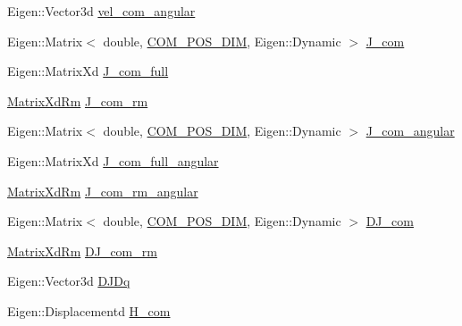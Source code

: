 \begin{DoxyCompactItemize}
\item 
\-Eigen\-::\-Vector3d \hyperlink{structOcraWbiModel_1_1OcraWbiModel__pimpl_a696d73e62837978589a2730c8feb325c}{vel\-\_\-com\-\_\-angular}
\item 
\-Eigen\-::\-Matrix$<$ double, \*
\hyperlink{OcraWbiModel_8cpp_a72cb22de2538ae949cc73fa3d7c33bdc}{\-C\-O\-M\-\_\-\-P\-O\-S\-\_\-\-D\-I\-M}, \-Eigen\-::\-Dynamic $>$ \hyperlink{structOcraWbiModel_1_1OcraWbiModel__pimpl_ab724e92a7f74f03c3842f22129b2ad94}{\-J\-\_\-com}
\item 
\-Eigen\-::\-Matrix\-Xd \hyperlink{structOcraWbiModel_1_1OcraWbiModel__pimpl_a73c9391019a2e36ddd2c2f9ef1773a41}{\-J\-\_\-com\-\_\-full}
\item 
\hyperlink{namespaceocra__icub_aa5e36a19ed031c28ca83c207bd7dd83f}{\-Matrix\-Xd\-Rm} \hyperlink{structOcraWbiModel_1_1OcraWbiModel__pimpl_a58b26a33ee0449f71a3d338c23ea29d5}{\-J\-\_\-com\-\_\-rm}
\item 
\-Eigen\-::\-Matrix$<$ double, \*
\hyperlink{OcraWbiModel_8cpp_a72cb22de2538ae949cc73fa3d7c33bdc}{\-C\-O\-M\-\_\-\-P\-O\-S\-\_\-\-D\-I\-M}, \-Eigen\-::\-Dynamic $>$ \hyperlink{structOcraWbiModel_1_1OcraWbiModel__pimpl_a1755993b2e425c6a49c55874c6c455e4}{\-J\-\_\-com\-\_\-angular}
\item 
\-Eigen\-::\-Matrix\-Xd \hyperlink{structOcraWbiModel_1_1OcraWbiModel__pimpl_ac064807ab1c8a89585cb7aa5f49d8744}{\-J\-\_\-com\-\_\-full\-\_\-angular}
\item 
\hyperlink{namespaceocra__icub_aa5e36a19ed031c28ca83c207bd7dd83f}{\-Matrix\-Xd\-Rm} \hyperlink{structOcraWbiModel_1_1OcraWbiModel__pimpl_ad52987f0908ab1b44779e3d752a7b97b}{\-J\-\_\-com\-\_\-rm\-\_\-angular}
\item 
\-Eigen\-::\-Matrix$<$ double, \*
\hyperlink{OcraWbiModel_8cpp_a72cb22de2538ae949cc73fa3d7c33bdc}{\-C\-O\-M\-\_\-\-P\-O\-S\-\_\-\-D\-I\-M}, \-Eigen\-::\-Dynamic $>$ \hyperlink{structOcraWbiModel_1_1OcraWbiModel__pimpl_a38a8628ca93524e08beada55f455249b}{\-D\-J\-\_\-com}
\item 
\hyperlink{namespaceocra__icub_aa5e36a19ed031c28ca83c207bd7dd83f}{\-Matrix\-Xd\-Rm} \hyperlink{structOcraWbiModel_1_1OcraWbiModel__pimpl_a864b4ce170b3526fba0f7e832bfbb2d8}{\-D\-J\-\_\-com\-\_\-rm}
\item 
\-Eigen\-::\-Vector3d \hyperlink{structOcraWbiModel_1_1OcraWbiModel__pimpl_accd197872291c3e90272b8ebd87cefc8}{\-D\-J\-Dq}
\item 
\-Eigen\-::\-Displacementd \hyperlink{structOcraWbiModel_1_1OcraWbiModel__pimpl_a5e031088136b048a403c9df06e62c2b8}{\-H\-\_\-com}

\end{DoxyCompactItemize}
